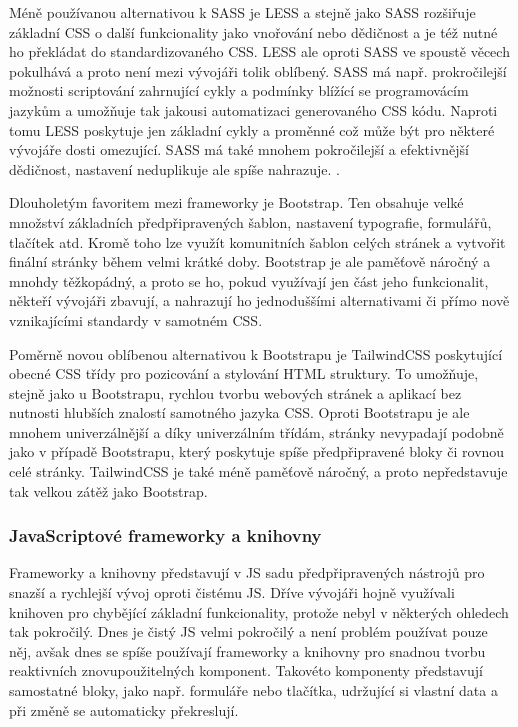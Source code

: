 		Méně používanou alternativou k \Ac{SASS} je \Ac{LESS} a stejně jako \Ac{SASS} rozšiřuje základní \Ac{CSS}
		o další funkcionality jako vnořování nebo dědičnost a je též nutné ho překládat do standardizovaného \Ac{CSS}. \cite{less_overview}
		\Ac{LESS} ale oproti \Ac{SASS} ve spoustě věcech pokulhává a proto není mezi vývojáři tolik oblíbený.
		\Ac{SASS} má např. prokročilejší možnosti scriptování zahrnující cykly a podmínky blížící se programovácím jazykům
		a umožňuje tak jakousi automatizaci generovaného \Ac{CSS} kódu.
		Naproti tomu \Ac{LESS} poskytuje jen základní cykly a proměnné což může být pro některé vývojáře dosti omezující.
		\Ac{SASS} má také mnohem pokročilejší a efektivnější dědičnost, nastavení neduplikuje ale spíše nahrazuje. \cite{sass_vs_less}.

		Dlouholetým favoritem mezi frameworky je Bootstrap.
		Ten obsahuje velké množství základních předpřipravených šablon, nastavení typografie, formulářů, tlačítek atd.
		Kromě toho lze využít komunitních šablon celých stránek a vytvořit finální stránky během velmi krátké doby.
		Bootstrap je ale paměťově náročný a mnohdy těžkopádný, a proto se ho, pokud využívají jen část jeho funkcionalit,
		někteří vývojáři zbavují, a nahrazují ho jednoduššími alternativami či přímo nově vznikajícími standardy
		v samotném \Ac{CSS}. \cite{bootstrap}

		Poměrně novou oblíbenou alternativou k Bootstrapu je TailwindCSS poskytující obecné \Ac{CSS} třídy pro
		pozicování a stylování \Ac{HTML} struktury.
		To umožňuje, stejně jako u Bootstrapu, rychlou tvorbu webových stránek a aplikací bez nutnosti hlubších znalostí
		samotného jazyka \Ac{CSS}. \cite{tailwindcss}
		Oproti Bootstrapu je ale mnohem univerzálnější a díky univerzálním třídám, stránky nevypadají podobně jako v případě
		Bootstrapu, který poskytuje spíše předpřipravené bloky či rovnou celé stránky.
		TailwindCSS je také méně paměťově náročný, a proto nepředstavuje tak velkou zátěž jako Bootstrap.
		\cite{tailwindcss_vs_bootstrap}

		\subsubsection{JavaScriptové frameworky a knihovny}

		Frameworky a knihovny představují v \ac{JS} sadu předpřipravených nástrojů pro snazší a rychlejší vývoj
		oproti čistému \ac{JS}.
		Dříve vývojáři hojně využívali knihoven pro chybějící základní funkcionality, protože nebyl v některých ohledech tak
		pokročilý.
		Dnes je čistý \ac{JS} velmi pokročilý a není problém používat pouze něj, avšak dnes se spíše
		používají frameworky a knihovny pro snadnou tvorbu reaktivních znovupoužitelných komponent.
		Takovéto komponenty představují samostatné bloky, jako např. formuláře nebo tlačítka, udržující si vlastní
		data a při změně se automaticky překreslují.

